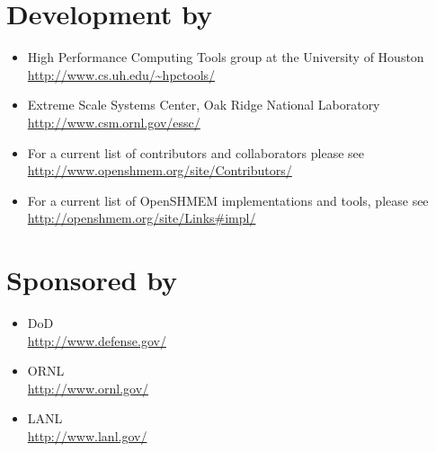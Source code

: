 \section*{Development by}
\begin{itemize}
\item High Performance Computing Tools group at the University of Houston\\
  \url{http://www.cs.uh.edu/~hpctools/}
\item Extreme Scale Systems Center, Oak Ridge National Laboratory\\
  \url{http://www.csm.ornl.gov/essc/}
\item For a current list of contributors and collaborators please see\\
  \url{http://www.openshmem.org/site/Contributors/}
\item For a current list of OpenSHMEM implementations and tools, please see\\
  \url{http://openshmem.org/site/Links#impl/}

\end{itemize}

\pagebreak{}

\section*{Sponsored by}
\begin{itemize}
\item \ac{DoD}\\
  \url{http://www.defense.gov/ }
\item \ac{ORNL}\\
  \url{http://www.ornl.gov/}
\item \ac{LANL}\\
  \url{http://www.lanl.gov/}
\end{itemize}

